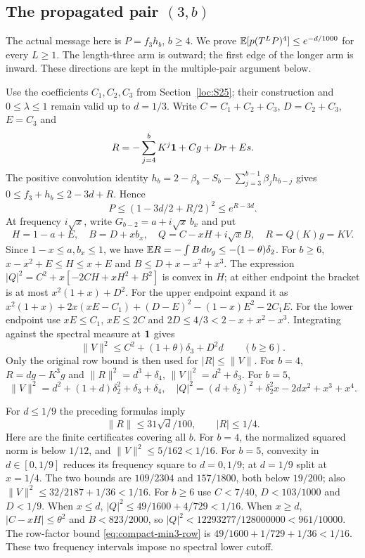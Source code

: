 \subsection[The propagated pair (3,b)]{The propagated pair $(3,b)$}\label{loc:S28}
The actual message here is $P=f_3h_b$, $b\ge4$.
We prove $\mathbb E[p(T^LP)^4]\le e^{-d/1000}$ for every $L\ge1$.
The length-three arm is outward; the first edge of the longer arm is
inward. These directions are kept in the multiple-pair argument below.

Use the coefficients $C_1,C_2,C_3$ from Section~\ref{loc:S25};
their construction and $0\le\lambda\le1$ remain valid up to $d=1/3$.
Write $C=C_1+C_2+C_3$, $D=C_2+C_3$, $E=C_3$ and
\[
 R=-\sum_{j=4}^bK^j\mathbf1+Cg+Dr+Es.
\]
The positive convolution identity
$h_b=2-\beta_b-S_b-\sum_{j=3}^{b-1}\beta_jh_{b-j}$ gives
$0\le f_3+h_b\le2-3d+R$. Hence
\begin{equation}\label{eq:compact-min3-envelope}
 P\le(1-3d/2+R/2)^2\le e^{R-3d}.
\end{equation}
At frequency $i\sqrt x$, write $G_{b-2}=a+i\sqrt x\,b_x$ and put
\[
 H=1-a+E,\quad B=D+xb_x,\quad
 Q=C-xH+i\sqrt x B,\quad R=Q(K)g=KV.
\]
Since $1-x\le a,b_x\le1$, we have
$\mathbb E R=-\int B\,d\nu_g\le-(1-\theta)\delta_{2}$.
For $b\ge6$, $x-x^2+E\le H\le x+E$ and
$B\le D+x-x^2+x^3$. The expression
$|Q|^2=C^2+x[-2CH+xH^2+B^2]$ is convex in $H$;
at either endpoint the bracket is at most $x^2(1+x)+D^2$.
For the upper endpoint expand it as
$x^2(1+x)+2x(xE-C_1)+(D-E)^2-(1-x)E^2-2C_1E$.
For the lower endpoint use $xE\le C_1$, $xE\le2C$ and
$2D\le4/3<2-x+x^2-x^3$.
Integrating against the spectral measure at $\mathbf1$ gives
\begin{equation}\label{eq:compact-min3-row}
 \|V\|^2\le C^2+(1+\theta)\delta_{3}+D^2d\qquad(b\ge6).
\end{equation}
Only the original row bound is then used for $|R|\le\|V\|$.
For $b=4$, $R=dg-K^3g$ and
$\|R\|^2=d^3+\delta_{4}$, $\|V\|^2=d^2+\delta_{3}$.
For $b=5$,
\[
 \|V\|^2=d^2+(1+d)\delta_{2}^2+\delta_{3}+\delta_{4},
 \quad |Q|^2=(d+\delta_{2})^2+\delta_{2}^2x-2dx^2+x^3+x^4.
\]

For $d\le1/9$ the preceding formulas imply
\begin{equation}\label{eq:compact-min3-small}
 \|R\|\le31\sqrt d/100,\qquad |R|\le1/4.
\end{equation}
Here are the finite certificates covering all $b$.
For $b=4$, the normalized squared norm is below $1/12$, and
$\|V\|^2\le5/162<1/16$.
For $b=5$, convexity in $d\in[0,1/9]$ reduces its frequency square to
$d=0,1/9$; at $d=1/9$ split at $x=1/4$.
The two bounds are $109/2304$ and $157/1800$, both below $19/200$;
also $\|V\|^2\le32/2187+1/36<1/16$.
For $b\ge6$ use $C<7/40$, $D<103/1000$ and $D<1/9$.
When $x\le d$, $|Q|^2\le49/1600+4/729<1/16$.
When $x\ge d$, $|C-xH|\le\theta^2$ and $B<823/2000$, so
$|Q|^2<12293277/128000000<961/10000$.
The row-factor bound \eqref{eq:compact-min3-row} is
$49/1600+1/729+1/36<1/16$.
These two frequency intervals impose no spectral lower cutoff.

